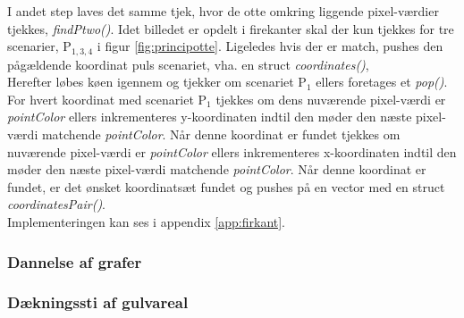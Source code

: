 I andet step laves det samme tjek, hvor de otte omkring liggende pixel-værdier tjekkes, \emph{findPtwo()}. Idet billedet er opdelt i firekanter skal der kun tjekkes for tre scenarier, P\(_{1, 3, 4}\) i figur \ref{fig:principotte}. Ligeledes hvis der er match, pushes den pågældende koordinat puls scenariet, vha. en struct \emph{coordinates()},\\
Herefter løbes køen igennem og tjekker om scenariet P\(_{1}\) ellers foretages et \emph{pop()}. For hvert koordinat med scenariet P\(_{1}\) tjekkes om dens nuværende pixel-værdi er \emph{pointColor} ellers inkrementeres y-koordinaten indtil den møder den næste pixel-værdi matchende \emph{pointColor}. Når denne koordinat er fundet tjekkes om nuværende pixel-værdi er \emph{pointColor} ellers inkrementeres x-koordinaten indtil den møder den næste pixel-værdi matchende \emph{pointColor}. Når denne koordinat er fundet, er det ønsket koordinatsæt fundet og pushes på en vector med en struct \emph{coordinatesPair()}.\\

Implementeringen kan ses i appendix \ref{app:firkant}. 

\subsubsection{Dannelse af grafer}

\subsubsection{Dækningssti af gulvareal}